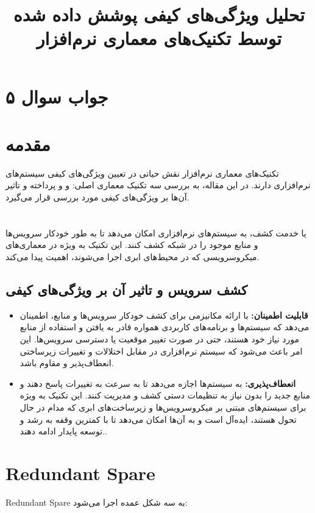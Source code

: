 \section*{جواب سوال ۵}

\title{تحلیل ویژگی‌های کیفی پوشش داده شده توسط تکنیک‌های معماری نرم‌افزار}
\author{}
\date{}

\section{مقدمه}
تکنیک‌های معماری نرم‌افزار نقش حیاتی در تعیین ویژگی‌های کیفی سیستم‌های نرم‌افزاری دارند. در این مقاله، به بررسی سه تکنیک معماری اصلی:
و
و
پرداخته و تاثیر آن‌ها بر ویژگی‌های کیفی مورد بررسی قرار می‌گیرد.

\section{}
یا خدمت کشف، به سیستم‌های نرم‌افزاری امکان می‌دهد تا به طور خودکار سرویس‌ها و منابع موجود را در شبکه کشف کنند. این تکنیک به ویژه در معماری‌های میکروسرویسی که در محیط‌های ابری اجرا می‌شوند، اهمیت پیدا می‌کند.

\subsection*{کشف سرویس و تاثیر آن بر ویژگی‌های کیفی}
\begin{itemize}
	\item \textbf{قابلیت اطمینان:} 
	 با ارائه مکانیزمی برای کشف خودکار سرویس‌ها و منابع، اطمینان می‌دهد که سیستم‌ها و برنامه‌های کاربردی همواره قادر به یافتن و استفاده از منابع مورد نیاز خود هستند، حتی در صورت تغییر موقعیت یا دسترسی سرویس‌ها. این امر باعث می‌شود که سیستم نرم‌افزاری در مقابل اختلالات و تغییرات زیرساختی انعطاف‌پذیر و مقاوم باشد.
	
	\item \textbf{انعطاف‌پذیری:}
	 به سیستم‌ها اجازه می‌دهد تا به سرعت به تغییرات پاسخ دهند و منابع جدید را بدون نیاز به تنظیمات دستی کشف و مدیریت کنند. این تکنیک به ویژه برای سیستم‌های مبتنی بر میکروسرویس‌ها و زیرساخت‌های ابری که مدام در حال تحول هستند، ایده‌آل است و به آن‌ها امکان می‌دهد تا با کمترین وقفه به رشد و توسعه پایدار ادامه دهند..
\end{itemize}

\section{Redundant Spare}
Redundant Spare
به سه شکل عمده اجرا می‌شود:

